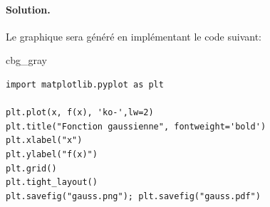 \documentclass[%
oneside,                 %
final,                   %
10pt,french]{article}
\newenvironment{_cod_tight}[1]{
   \def\FrameCommand{\colorbox{#1}}
   \FrameRule0.6pt\MakeFramed {\FrameRestore}\vskip3mm}
   {\vskip0mm\endMakeFramed}
\newenvironment{cod}[1]{
\bgroup\rmfamily
\fboxsep=0mm\relax
\begin{_cod_tight}{#1}
\list{}{\parsep=-2mm\parskip=0mm\topsep=0pt\leftmargin=2mm
\rightmargin=2\leftmargin\leftmargin=4pt\relax}
\item\relax}
{\endlist\end{_cod_tight}\egroup}
\newenvironment{doconceexercise}{}{}
\begin{document}
\begin{doconceexercise}


\paragraph{Solution.}
Le graphique sera généré en implémentant le code suivant:
\begin{cod}{cbg_gray}\begin{verbatim}
import matplotlib.pyplot as plt

plt.plot(x, f(x), 'ko-',lw=2)
plt.title("Fonction gaussienne", fontweight='bold')
plt.xlabel("x")
plt.ylabel("f(x)")
plt.grid()
plt.tight_layout()
plt.savefig("gauss.png"); plt.savefig("gauss.pdf")

\end{verbatim}
\end{cod}
\noindent


\end{doconceexercise}


\end{document}
